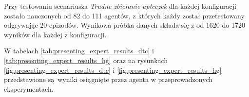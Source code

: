 Przy testowaniu scenariusza \textit{Trudne zbieranie apteczek} dla każdej konfiguracji zostało nauczonych od 82 do 111 agentów, z których każdy został przetestowany odgrywając 20 epizodów. Wynikowa próbka danych składa się z od 1620 do 1720 wyników dla każdej z konfiguracji.

W tabelach \ref{tab:presenting_expert_results_dtc} i \ref{tab:presenting_expert_results_hg}  oraz na rysunkach \ref{fig:presenting_expert_results_dtc} i \ref{fig:presenting_expert_results_hg}  przedstawione są wyniki osiągnięte przez agenta w przeprowadzonych eksperymentach.

\begin{figure}[H]
\end{figure}

